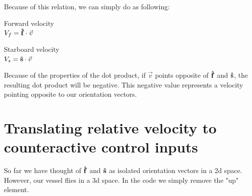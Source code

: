 \documentclass[11pt]{article}
\begin{document}
\begin{center}
        \hspace*{\fill}
    \end{center}

    Because of this relation, we can simply do as following:
    \begin{center}
        Forward velocity\\
        $V_f = \vu{f} \cdot \vec{v}$

        Starboard velocity\\
        $V_s = \vu{s} \cdot \vec{v}$
    \end{center}
        \vspace{1em}
    Because of the properties of the dot product, if $\vec{v}$ points opposite of $\vu{f}$ and $\vu{s}$, the resulting dot product will be negative.
    This negative value represents a velocity pointing opposite to our orientation vectors.


\section{Translating relative velocity to counteractive control inputs}

    So far we have thought of $\vu{f}$ and $\vu{s}$ as isolated orientation vectors in a 2d space.
    However, our vessel flies in a 3d space. 
    In the code we simply remove the "up" element.\\
\end{document}

